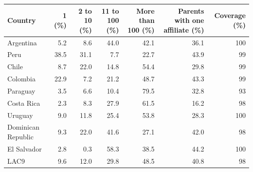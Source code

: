 \begin{tabular}{lrrrrrr}
\toprule
Country & 1 (\%) & 2 to 10 (\%) & 11 to 100 (\%) & More than 100 (\%) & Parents with one affiliate (\%) & Coverage (\%) \\
\midrule
Argentina & 5.2 & 8.6 & 44.0 & 42.1 & 36.1 & 100 \\
Peru & 38.5 & 31.1 & 7.7 & 22.7 & 43.9 & 99 \\
Chile & 8.7 & 22.0 & 14.8 & 54.4 & 29.8 & 99 \\
Colombia & 22.9 & 7.2 & 21.2 & 48.7 & 43.3 & 99 \\
Paraguay & 3.5 & 6.6 & 10.4 & 79.5 & 32.8 & 93 \\
Costa Rica & 2.3 & 8.3 & 27.9 & 61.5 & 16.2 & 98 \\
Uruguay & 9.0 & 11.8 & 25.4 & 53.8 & 28.3 & 100 \\
Dominican Republic & 9.3 & 22.0 & 41.6 & 27.1 & 42.0 & 98 \\
El Salvador & 2.8 & 0.3 & 58.3 & 38.5 & 44.2 & 100 \\
\midrule
LAC9 & 9.6 & 12.0 & 29.8 & 48.5 & 40.8 & 98 \\
\bottomrule
\end{tabular}
